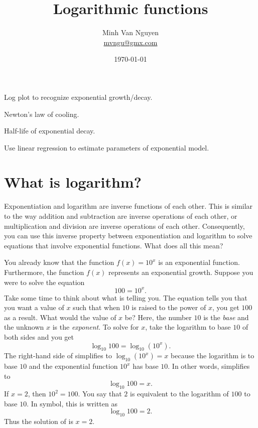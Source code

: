 \documentclass[a4paper,oneside,12pt]{article}
\begin{document}
\title{\Large\bf Logarithmic functions}
\author{%
  Minh Van Nguyen \\
  \url{mvngu@gmx.com}
}
\date{\today}
\maketitle

{\color{red}
\begin{packeditem}
\item Log plot to recognize exponential growth/decay.

\item Newton's law of cooling.

\item Half-life of exponential decay.

\item Use linear regression to estimate parameters of exponential
  model.
\end{packeditem}
}



\section{What is logarithm?}

Exponentiation and logarithm are inverse functions of each other.
This is similar to the way addition and subtraction are inverse
operations of each other, or multiplication and division are inverse
operations of each other.  Consequently, you can use this inverse
property between exponentiation and logarithm to solve equations that
involve exponential functions.  What does all this mean?

You already know that the function $f(x) = 10^x$ is an exponential
function.  Furthermore, the function $f(x)$ represents an exponential
growth.  Suppose you were to solve the equation
\begin{equation}
\label{eqn:exponential_growth_100_10_x}
100
=
10^x.
\end{equation}
Take some time to think about what
 is telling you.  The
equation tells you that you want a value of $x$ such that when $10$ is
raised to the power of $x$, you get $100$ as a result.  What would the
value of $x$ be?  Here, the number $10$ is the \emph{base} and the
unknown $x$ is the \emph{exponent}.  To solve
 for $x$, take the logarithm
to base $10$ of both sides and you get
\begin{equation}
\label{eqn:log10_100}
\log_{10} 100
=
\log_{10} (10^x).
\end{equation}
The right-hand side of  simplifies to
$\log_{10} (10^x) = x$ because the logarithm is to base $10$ and the
exponential function $10^x$ has base $10$.  In other words,
 simplifies to
\[
\log_{10} 100
=
x.
\]
If $x = 2$, then $10^2 = 100$.  You say that $2$ is equivalent to the
logarithm of $100$ to base $10$.  In symbol, this is written as
\[
\log_{10}100
=
2.
\]
Thus the solution of  is
$x = 2$.
\end{document}
